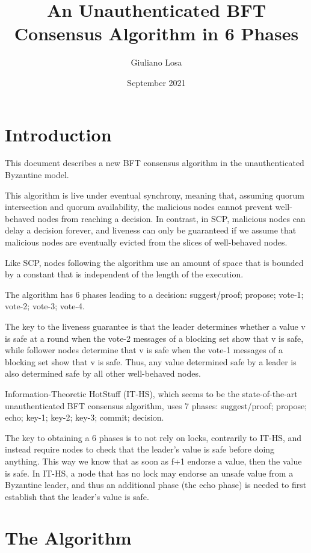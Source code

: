 \documentclass[11pt]{article}
\title{An Unauthenticated BFT Consensus Algorithm in 6 Phases}
\date{September 2021}
\author{Giuliano Losa}
\begin{document}
\maketitle

\section{Introduction}


This document describes a new BFT consensus algorithm in the unauthenticated Byzantine model.

This algorithm is live under eventual synchrony, meaning that, assuming quorum intersection and quorum availability, the malicious nodes cannot prevent well-behaved nodes from reaching a decision.
In contrast, in SCP, malicious nodes can delay a decision forever, and liveness can only be guaranteed if we assume that malicious nodes are eventually evicted from the slices of well-behaved nodes.


Like SCP, nodes following the algorithm use an amount of space that is bounded by
a constant that is independent of the length of the execution.

The algorithm has 6 phases leading to a decision: suggest/proof; propose;
vote-1; vote-2; vote-3; vote-4. 

The key to the liveness guarantee is that the leader determines whether a value v is safe at a round when the vote-2 messages of a blocking set show that v is safe, while follower nodes determine that v is safe when the vote-1 messages of a blocking set show that v is safe.
Thus, any value determined safe by a leader is also determined safe by all other well-behaved nodes.

Information-Theoretic HotStuff (IT-HS), which seems to be the state-of-the-art
unauthenticated BFT consensus algorithm, uses 7 phases: suggest/proof; propose; echo;
key-1; key-2; key-3; commit; decision.

The key to obtaining a 6 phases is to not rely on locks, contrarily to IT-HS, and
instead require nodes to check that the leader's value is safe before doing
anything.  This way we know that as soon as f+1 endorse a value, then the value
is safe.  In IT-HS, a node that has no lock may endorse an unsafe value from a
Byzantine leader, and thus an additional phase (the echo phase) is needed to
first establish that the leader's value is safe.

\section{The Algorithm}
\end{document}
